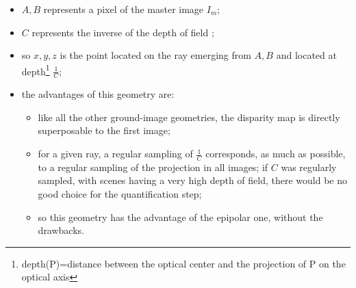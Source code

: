 \begin{itemize}
   \item  $A,B$ represents a pixel of the master image $I_m$;
   \item  $C$ represents the inverse of the depth of field ;
   \item so $x,y,z$ is the point located on the ray emerging from $A,B$ and
         located at depth\footnote{depth(P)=distance between the optical center and the projection of P on the optical axis} $\frac1C$;
   \item the advantages of this geometry are:
\begin{itemize}
   \item like all the other ground-image geometries, the disparity map is directly superposable to
          the first image;
   \item for a given ray, a regular sampling of  $\frac1C$ corresponds, as much as possible, to a regular sampling
         of the projection in all images; if $C$ was regularly sampled, with scenes having a very high depth
         of field, there would be no good choice for the quantification step;
    \item so this geometry has the advantage of the epipolar one, without the drawbacks.
\end{itemize}
\end{itemize}



